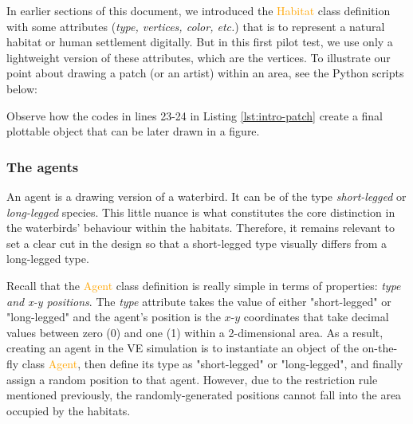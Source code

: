 In earlier sections of this document, we introduced the \textcolor{orange}{Habitat} class definition with some attributes (\emph{type, vertices, color, etc.}) that is to represent a natural habitat or human settlement digitally. But in this first pilot test, we use only a lightweight version of these attributes, which are the vertices. To illustrate our point about drawing a patch (or an artist) within an area, see the Python scripts below:


\noindent
Observe how the codes in lines 23-24 in Listing \ref{lst:intro-patch} create a final plottable object that can be later drawn in a figure.

\subsubsection{The agents}
An agent is a drawing version of a waterbird. It can be of the type \emph{short-legged} or \emph{long-legged} species. This little nuance is what constitutes the core distinction in the waterbirds' behaviour within the habitats. Therefore, it remains relevant to set a clear cut in the design so that a short-legged type visually differs from a long-legged type.

Recall that the \textcolor{orange}{Agent} class definition is really simple in terms of properties: \emph{type and x-y positions}. The \emph{type} attribute takes the value of either "short-legged" or "long-legged" and the agent's position is the $x$-$y$ coordinates that take decimal values between zero (0) and one (1) within a 2-dimensional area. As a result, creating an agent in the VE simulation is to instantiate an object of the on-the-fly class \textcolor{orange}{Agent}, then define its type as "short-legged" or "long-legged", and finally assign a random position to that agent. However, due to the restriction rule mentioned previously, the randomly-generated positions cannot fall into the area occupied by the habitats.


